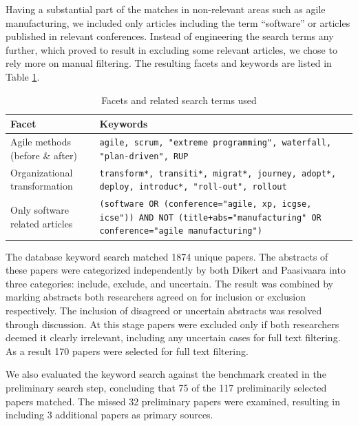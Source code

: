 \documentclass[preprint,authoryear,12pt]{elsarticle}
\begin{document}
Having a substantial part of the matches in non-relevant areas such as agile
manufacturing, we included only articles including the term ``software'' or
articles published in relevant conferences. Instead of engineering the search
terms any further, which proved to result in excluding some relevant articles,
we chose to rely more on manual filtering. The resulting facets and keywords are
listed in Table \ref{table:searchterms}.

\begin{table}
    \centering
    \begin{tabular}{ >{\raggedright\arraybackslash}p{}
                     >{\raggedright\arraybackslash}p{} }
        \toprule
        Facet                  & Keywords   \\
        \midrule
        Agile methods (before \& after) &
            \texttt{agile, scrum, "extreme programming",
            waterfall, "plan-driven", RUP}\\
        Organizational transformation &
            \texttt{transform*, transiti*, migrat*, journey, adopt*, deploy, introduc*,
            "roll-out", rollout}\\
        Only software related articles &
            \texttt{(software OR (conference="agile, xp, icgse, icse"))
            AND NOT (title+abs="manufacturing" OR conference="agile manufacturing")}
        \\
        \bottomrule
    \end{tabular}
    \caption{Facets and related search terms used}
    \label{table:searchterms}
\end{table}

The database keyword search matched 1874 unique papers. The abstracts of these
papers were categorized independently by both Dikert and Paasivaara into three
categories: include, exclude, and uncertain. The result was combined by marking
abstracts both researchers agreed on for inclusion or exclusion respectively.
The inclusion of disagreed or uncertain abstracts was resolved through
discussion. At this stage papers were excluded only if both researchers deemed
it clearly irrelevant, including any uncertain cases for full text filtering. As
a result 170 papers were selected for full text filtering.

We also evaluated the keyword search against the benchmark created in the
preliminary search step, concluding that 75 of the 117 preliminarily selected
papers matched. The missed 32 preliminary papers were examined, resulting in
including 3 additional papers as primary sources.
\end{document}
